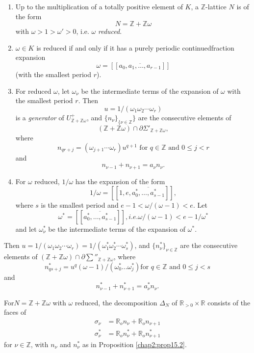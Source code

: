 \setcounter{prop}{1}
\begin{prop}\label{chap2:prop15.2}
\begin{enumerate}[(1)]
\item Up to the multiplication of a totally positive element of $K$, a
  $\mathbb{Z}$-lattice $N$ is of the form  
$$
N =\mathbb{Z}+ \mathbb{Z} \omega 
$$
with $\omega > 1 > \omega' > 0$, i.e. $\omega$ \textit{reduced}.

\item $\omega \in K$ is reduced if and only if it has a purely periodic
  continued\pageoriginale fraction expansion  
$$
\omega = [[ \overline{a_0, a_1, \ldots , a_{r-1}}]] 
$$
(with the smallest period $r$).

\item For reduced $\omega$, let $\omega_{\nu}$ be the intermediate
  terms of the expansion of $\omega$ with the smallest period
  $r$. Then  
$$
u = 1/(\omega_1 \omega_2 \cdots \omega_r) 
$$
is a \textit{generator} of $U^+_{\mathbb{Z}+\mathbb{Z}\omega}$, and
$\{ n_{\nu}\}_{\{\nu \in \mathbb{Z}} \}$ are the consecutive elements
of  
$$
(\mathbb{Z}+\mathbb{Z}\omega) \cap \partial \Sigma'_{\mathbb{Z}+
    \mathbb{Z} \omega}, 
$$
where 
$$
n_{qr + j}= (\omega_{j+1} \cdots \omega_r)u^{q+1} \text{ for } q \in 
\mathbb{Z} \text{ and } 0 \leq j < r 
$$
and 
$$
n_{\nu -1}+ n_{\nu +1} = a_{\nu}n_{\nu}.
$$

\item For $\omega$ reduced, $1/ \omega $ has the expansion of the form  
$$
1 / \omega = [[1,e,  \overline{a^*_0, \ldots , a^*_{s-1}}]],
$$
where $s$ is the smallest period and $e - 1 < \omega / (\omega-1) < e$. Let 
$$
 \omega^* = [[ \overline{a^*_0,  \ldots , a^*_{s-1}}]], i. e. \omega /
 (\omega-1) < e-1/ \omega^* 
$$
and let $\omega^*_{\nu}$ be the intermediate terms of the expansion of
$\omega^*$. 
\end{enumerate}
\end{prop}

\noindent
Then $u = 1/ (\omega_1 \omega_2 \cdots \omega_r) = 1/ (\omega^*_1
\omega^*_2 \cdots \omega^*_s)$, and $\{ n^*_{\nu} \}_{\nu \in
  \mathbb{Z}}$ are the consecutive elements of
$(\mathbb{Z}+\mathbb{Z}\omega) \cap \partial \sum''_{\mathbb{Z}+
  \mathbb{Z} \omega}$, where 
$$
n^*_{qs +j} = u^q (\omega-1) / (\omega^*_0 \ldots \omega^*_j) \text{
  for } q \in \mathbb{Z} \text{ and } 0 \leq j < s 
$$
and 
$$
n^*_{\nu - 1}+ n^*_{\nu +1 } = a^*_{\nu}n_{\nu}.
$$

\setcounter{coro}{2}
\begin{coro}\label{chap2:coro15.3} %
For\pageoriginale $N = \mathbb{Z}+\mathbb{Z}\omega$ with $\omega$
reduced,  the 
decomposition $\Delta_N$ of $\mathbb{R}_{> 0} \times \mathbb{R}$ consists
of the faces of  
\begin{align*}
\sigma_{\nu} & = \mathbb{R}_o n_{\nu}+ \mathbb{R}_o n_{\nu +1}\\
\sigma^*_{\nu}& = \mathbb{R}_o n^*_{\nu}+ \mathbb{R}_o n^*_{\nu +1}
\end{align*} 
for $\nu \in \mathbb{Z}$, with $n_{\nu}$ and $n^*_{\nu}$ as in
Proposition \ref{chap2:prop15.2}. 
\end{coro}


